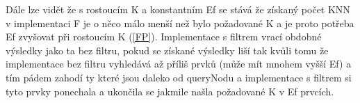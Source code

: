 \documentclass[czech,semestral,dept460,male,csharp,cpdeclaration]{diploma}
\begin{document}
		Dále lze vidět že s rostoucím K a konstantním Ef se stává že získaný počet KNN v implementaci F je o něco málo menší než bylo požadované K a je proto potřeba Ef zvyšovat při rostoucím K (\ref{FP}). Implementace s filtrem vrací obdobné výsledky jako ta bez filtru, pokud se získané výsledky liší tak kvůli tomu že implementace bez filtru vyhledává až příliš prvků (může mít mnohem vyšší Ef) a tím pádem zahodí ty které jsou daleko od queryNodu a implementace s filtrem si tyto prvky ponechala a ukončila se jakmile našla požadované K v Ef prvcích.
		
		\newpage
		
		\begin{center}
			
			\begin{tabular}{c c c c c c c c}\label{FBC}
				

\end{tabular}
\end{center}
\end{document}
